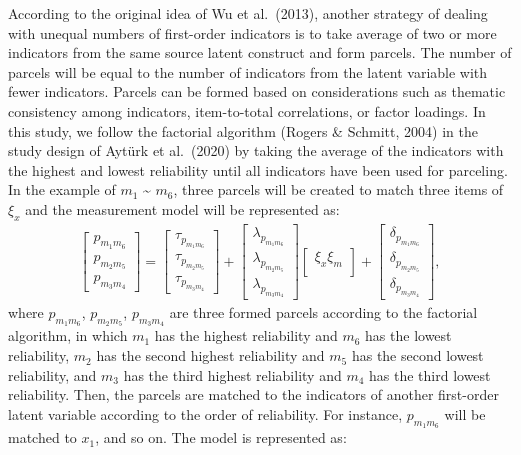 \documentclass[
  man]{apa7}
\begin{document}
According to the original idea of Wu et al.~(2013), another strategy of dealing with unequal numbers of first-order indicators is to take average of two or more indicators from the same source latent construct and form parcels. The number of parcels will be equal to the number of indicators from the latent variable with fewer indicators. Parcels can be formed based on considerations such as thematic consistency among indicators, item-to-total correlations, or factor loadings. In this study, we follow the factorial algorithm (Rogers \& Schmitt, 2004) in the study design of Aytürk et al.~(2020) by taking the average of the indicators with the highest and lowest reliability until all indicators have been used for parceling. In the example of \(m_{1}\) \textasciitilde{} \(m_{6}\), three parcels will be created to match three items of \(\xi_{x}\) and the measurement model will be represented as:
\begin{align}
    \begin{bmatrix}
        p_{m_{1}m_{6}} \\
        p_{m_{2}m_{5}} \\ 
        p_{m_{3}m_{4}}
    \end{bmatrix} =
    \begin{bmatrix}
        \tau_{p_{m_{1}m_{6}}} \\
        \tau_{p_{m_{2}m_{5}}} \\ 
        \tau_{p_{m_{3}m_{4}}}
    \end{bmatrix} +
    \begin{bmatrix}
        \lambda_{p_{m_{1}m_{6}}} \\
        \lambda_{p_{m_{2}m_{5}}} \\ 
        \lambda_{p_{m_{3}m_{4}}}
    \end{bmatrix}
    \begin{bmatrix}
        \xi_{x}\xi_{m} \\
    \end{bmatrix} +
    \begin{bmatrix}
        \delta_{p_{m_{1}m_{6}}} \\
        \delta_{p_{m_{2}m_{5}}} \\ 
        \delta_{p_{m_{3}m_{4}}}
    \end{bmatrix},
\end{align}
where \(p_{m_{1}m_{6}}\), \(p_{m_{2}m_{5}}\), \(p_{m_{3}m_{4}}\) are three formed parcels according to the factorial algorithm, in which \(m_{1}\) has the highest reliability and \(m_{6}\) has the lowest reliability, \(m_{2}\) has the second highest reliability and \(m_{5}\) has the second lowest reliability, and \(m_{3}\) has the third highest reliability and \(m_{4}\) has the third lowest reliability. Then, the parcels are matched to the indicators of another first-order latent variable according to the order of reliability. For instance, \(p_{m_{1}m_{6}}\) will be matched to \(x_{1}\), and so on. The model is represented as:
\end{document}

